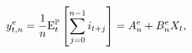 \begin{equation*}
	y_{t,n}^{e} = \frac{1}{n} \mathrm{E}^{\mathbb{P}}_{t} \left[ \sum_{j=0} ^{n-1} i_{t+j} \right] = A_{n}^{e} + B_{n}^{e} X_{t},
\end{equation*}